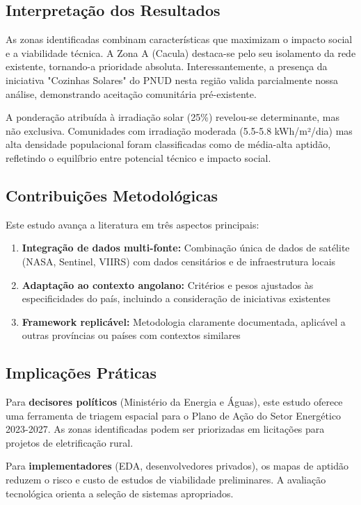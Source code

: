 \documentclass[12pt, a4paper]{article}
\begin{document}
\subsection{Interpretação dos Resultados}

As zonas identificadas combinam características que maximizam o impacto social e a viabilidade técnica. A Zona A (Cacula) destaca-se pelo seu isolamento da rede existente, tornando-a prioridade absoluta. Interessantemente, a presença da iniciativa "Cozinhas Solares" do PNUD nesta região valida parcialmente nossa análise, demonstrando aceitação comunitária pré-existente.

A ponderação atribuída à irradiação solar (25\%) revelou-se determinante, mas não exclusiva. Comunidades com irradiação moderada (5.5-5.8 kWh/m²/dia) mas alta densidade populacional foram classificadas como de média-alta aptidão, refletindo o equilíbrio entre potencial técnico e impacto social.

\subsection{Contribuições Metodológicas}

Este estudo avança a literatura em três aspectos principais:
\begin{enumerate}
    \item \textbf{Integração de dados multi-fonte:} Combinação única de dados de satélite (NASA, Sentinel, VIIRS) com dados censitários e de infraestrutura locais
    \item \textbf{Adaptação ao contexto angolano:} Critérios e pesos ajustados às especificidades do país, incluindo a consideração de iniciativas existentes
    \item \textbf{Framework replicável:} Metodologia claramente documentada, aplicável a outras províncias ou países com contextos similares
\end{enumerate}

\subsection{Implicações Práticas}

Para \textbf{decisores políticos} (Ministério da Energia e Águas), este estudo oferece uma ferramenta de triagem espacial para o Plano de Ação do Setor Energético 2023-2027. As zonas identificadas podem ser priorizadas em licitações para projetos de eletrificação rural.

Para \textbf{implementadores} (EDA, desenvolvedores privados), os mapas de aptidão reduzem o risco e custo de estudos de viabilidade preliminares. A avaliação tecnológica orienta a seleção de sistemas apropriados.
\end{document}
